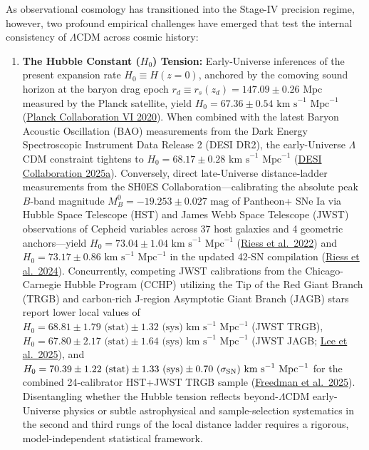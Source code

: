 \documentclass[11pt,letterpaper]{article}
\begin{document}
As observational cosmology has transitioned into the Stage-IV precision regime, however, two profound empirical challenges have emerged that test the internal consistency of $\Lambda$CDM across cosmic history:

\begin{enumerate}
    \setlength{\itemsep}{3pt}
    \item \textbf{The Hubble Constant ($H_0$) Tension:} Early-Universe inferences of the present expansion rate $H_0 \equiv H(z=0)$, anchored by the comoving sound horizon at the baryon drag epoch $r_d \equiv r_s(z_d) = 147.09 \pm 0.26\text{ Mpc}$ measured by the Planck satellite, yield $H_0 = 67.36 \pm 0.54\text{ km s}^{-1}\text{ Mpc}^{-1}$ (\href{https://arxiv.org/abs/1807.06209}{Planck Collaboration VI 2020}). When combined with the latest Baryon Acoustic Oscillation (BAO) measurements from the Dark Energy Spectroscopic Instrument Data Release 2 (DESI DR2), the early-Universe $\Lambda$CDM constraint tightens to $H_0 = 68.17 \pm 0.28\text{ km s}^{-1}\text{ Mpc}^{-1}$ (\href{https://arxiv.org/abs/2503.14738}{DESI Collaboration 2025a}). Conversely, direct late-Universe distance-ladder measurements from the SH0ES Collaboration—calibrating the absolute peak $B$-band magnitude $M_B^0 = -19.253 \pm 0.027\text{ mag}$ of Pantheon+ SNe Ia via Hubble Space Telescope (HST) and James Webb Space Telescope (JWST) observations of Cepheid variables across 37 host galaxies and 4 geometric anchors—yield $H_0 = 73.04 \pm 1.04\text{ km s}^{-1}\text{ Mpc}^{-1}$ (\href{https://arxiv.org/pdf/2112.04510}{Riess et al.\ 2022}) and $H_0 = 73.17 \pm 0.86\text{ km s}^{-1}\text{ Mpc}^{-1}$ in the updated 42-SN compilation (\href{https://arxiv.org/abs/2408.11770}{Riess et al.\ 2024}). Concurrently, competing JWST calibrations from the Chicago-Carnegie Hubble Program (CCHP) utilizing the Tip of the Red Giant Branch (TRGB) and carbon-rich J-region Asymptotic Giant Branch (JAGB) stars report lower local values of $H_0 = 68.81 \pm 1.79\text{ (stat)} \pm 1.32\text{ (sys)}\text{ km s}^{-1}\text{ Mpc}^{-1}$ (JWST TRGB), $H_0 = 67.80 \pm 2.17\text{ (stat)} \pm 1.64\text{ (sys)}\text{ km s}^{-1}\text{ Mpc}^{-1}$ (JWST JAGB; \href{https://arxiv.org/abs/2408.03474}{Lee et al.\ 2025}), and $H_0 = 70.39 \pm 1.22\text{ (stat)} \pm 1.33\text{ (sys)} \pm 0.70\text{ ($\sigma_{\rm SN}$)}\text{ km s}^{-1}\text{ Mpc}^{-1}$ for the combined 24-calibrator HST+JWST TRGB sample (\href{https://arxiv.org/abs/2408.06153}{Freedman et al.\ 2025}). Disentangling whether the Hubble tension reflects beyond-$\Lambda$CDM early-Universe physics or subtle astrophysical and sample-selection systematics in the second and third rungs of the local distance ladder requires a rigorous, model-independent statistical framework.

\end{enumerate}
\end{document}
